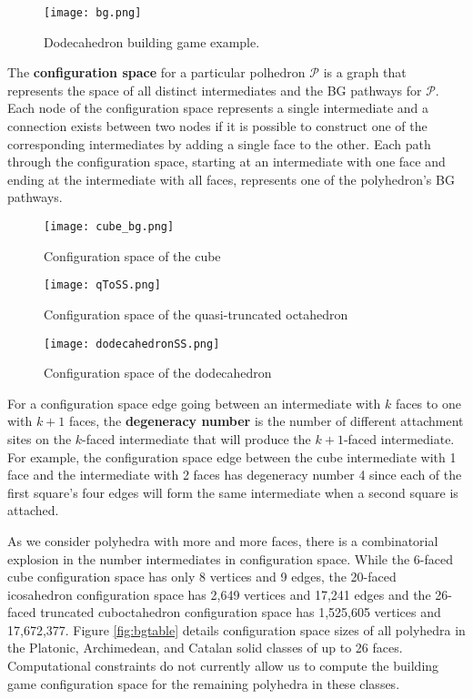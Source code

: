 \documentclass[12pt]{article}
\begin{document}
\begin{figure}[!h]
\centering
\texttt{[image: bg.png]}
\caption{Dodecahedron building game example.}
\label{fig:bg}
\end{figure}

The \textbf{configuration space} for a particular polhedron $\mathcal{P}$ is a graph that represents the space of all distinct intermediates and the BG pathways for $\mathcal{P}$. Each node of the configuration space represents a single intermediate and a connection exists between two nodes if it is possible to construct one of the corresponding intermediates by adding a single face to the other. Each path through the configuration space, starting at an intermediate with one face and ending at the intermediate with all faces, represents one of the polyhedron's BG pathways. 

\begin{figure}[h]
\centering
\texttt{[image: cube\_bg.png]}
\caption{Configuration space of the cube}
\label{fig:cube_bg}
\end{figure}

\begin{figure}[h]
\centering
\texttt{[image: qToSS.png]}
\caption{Configuration space of the quasi-truncated octahedron}
\label{fig:qToSS}
\end{figure}

\begin{figure}[h]
\centering
\texttt{[image: dodecahedronSS.png]}
\caption{Configuration space of the dodecahedron}
\label{fig:dodecahedronSS}
\end{figure}


For a configuration space edge going between an intermediate with $k$ faces to one with $k+1$ faces, the \textbf{degeneracy number} is the number of different attachment sites on the $k$-faced intermediate that will produce the $k+1$-faced intermediate. For example, the configuration space edge between the cube intermediate with 1 face and the intermediate with 2 faces has degeneracy number 4 since each of the first square's four edges will form the same intermediate when a second square is attached. 


As we consider polyhedra with more and more faces, there is a combinatorial explosion in the number intermediates in configuration space. While the 6-faced cube configuration space has only 8 vertices and 9 edges, the 20-faced icosahedron configuration space has 2,649 vertices and 17,241 edges and the 26-faced truncated cuboctahedron configuration space has 1,525,605 vertices and 17,672,377. Figure \ref{fig:bgtable} details configuration space sizes of all polyhedra in the Platonic, Archimedean, and Catalan solid classes of up to 26 faces. Computational constraints do not currently allow us to compute the building game configuration space for the remaining polyhedra in these classes.
\end{document}
